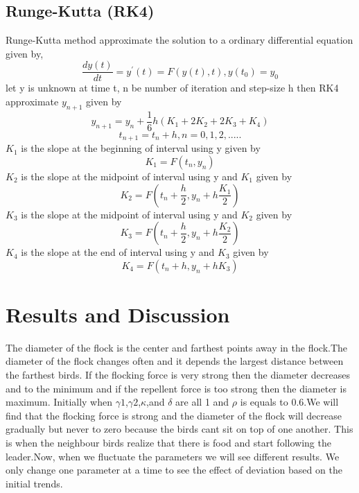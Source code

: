 \documentclass{article}
\begin{document}
\subsection{Runge-Kutta (RK4)}
Runge-Kutta method approximate the solution to a ordinary differential equation given by, 
\begin{equation*}
    \frac{dy(t)} {dt} = y^{'}(t)= F(y(t),t),  y(t_0) = y_0
\end{equation*}
let y is unknown at time t, n be number of iteration and step-size h then RK4 approximate $y_{n+1}$ given by
\begin{equation*}
y_{n+1}=y_n+\frac{1}{6}h(K_1+2K_2+2K_3+K_4) 
 \end{equation*}
 \begin{equation*}
 t_{n+1} = t_n +h,           n=0,1,2,.....
\end{equation*}
$K_1$ is the slope at the beginning of interval using y given by
 \begin{equation*}
 K_1 = F(t_n,y_n)
\end{equation*}
$K_2$ is the slope at the midpoint of interval using y and $K_1$ given by 
\begin{equation*}
    K_2 = F(t_n+\frac{h}{2},y_n+h \frac{K_1}{2})
\end{equation*}
$K_3$ is the slope at the midpoint of interval using y and $K_2$ given by 
\begin{equation*}
    K_3 = F(t_n+\frac{h}{2},y_n+h \frac{K_2}{2})
\end{equation*}
$K_4$ is the slope at the end of interval using y and $K_3$ given by 
\begin{equation*}
    K_4 = F(t_n+h,y_n+hK_3)
\end{equation*}



\section{Results and Discussion}

The diameter of the flock is the center and farthest points away in the flock.The diameter of the flock changes often and it depends the largest distance between the farthest birds. If the flocking force is very strong then the diameter decreases and to the minimum and if the repellent force is too strong then the diameter is maximum.
Initially when {$\gamma1$},{$\gamma2$},{$\kappa$},and {$\delta$} are all 1 and {$\rho$} is equals to 0.6.We will find that the flocking force is strong and the diameter of the flock will decrease gradually but never to zero because the birds cant sit on top of one another. This is when the neighbour birds realize that there is food and start following the leader.Now, when we fluctuate the parameters we will see different results. We only change one parameter at a time to see the effect of deviation based on the initial trends.
\end{document}
